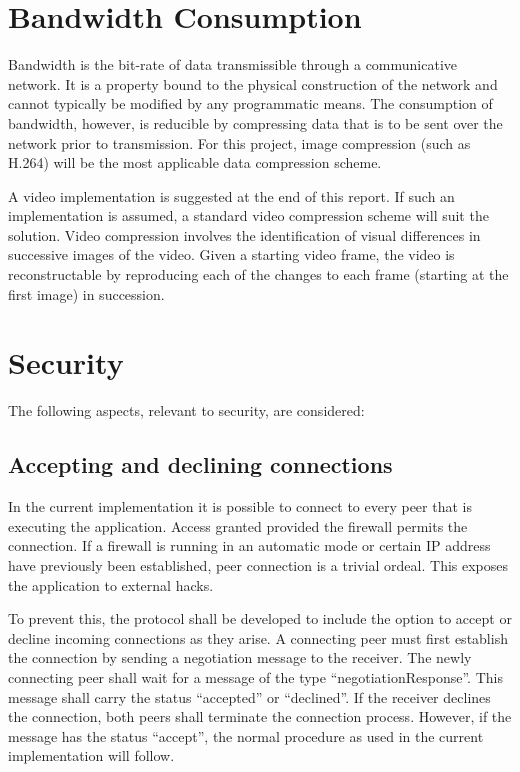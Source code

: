 \documentclass[10pt, a4paper]{article}
\title{\mytitle}
\author{
Benjamin Barann, bbarann, 708745 \and
Adam Juraszek, ajuraszek, 711466 \and
Jack Reardon, jackr, 643253
}
\begin{document}
\maketitle

\section{Bandwidth Consumption}

Bandwidth is the bit-rate of data transmissible through a communicative network. \cite{distributedsystems}
It is a property bound to the physical construction of the network and cannot typically be modified by any programmatic means.
The consumption of bandwidth, however, is reducible by compressing data that is to be sent over the network prior to transmission.
For this project, image compression (such as H.264) will be the most applicable data compression scheme.

A video implementation is suggested at the end of this report.
If such an implementation is assumed, a standard video compression scheme will suit the solution.
Video compression involves the identification of visual differences in successive images of the video.
Given a starting video frame, the video is reconstructable by reproducing each of the changes to each frame (starting at the first image) in succession.

\section{Security}

The following aspects, relevant to security, are considered:

\subsection{Accepting and declining connections}

In the current implementation it is possible to connect to every peer that is executing the application.
Access granted provided the firewall permits the connection.
If a firewall is running in an automatic mode or certain IP address have previously been established, peer connection is a trivial ordeal.
This exposes the application to external hacks.

To prevent this, the protocol shall be developed to include the option to accept or decline incoming connections as they arise.
A connecting peer must first establish the connection by sending a negotiation message to the receiver.
The newly connecting peer shall wait for a message of the type ``negotiationResponse''.
This message shall carry the status ``accepted'' or ``declined''.
If the receiver declines the connection, both peers shall terminate the connection process.
However, if the message has the status ``accept'', the normal procedure as used in the current implementation will follow.
\end{document}

